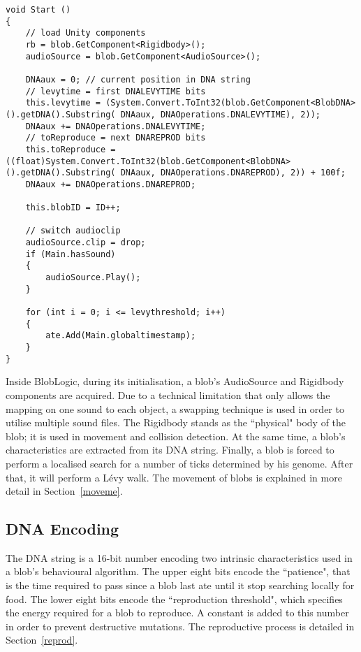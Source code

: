 \begin{lstlisting}
void Start ()
{
    // load Unity components
    rb = blob.GetComponent<Rigidbody>();
    audioSource = blob.GetComponent<AudioSource>();

    DNAaux = 0; // current position in DNA string
    // levytime = first DNALEVYTIME bits
    this.levytime = (System.Convert.ToInt32(blob.GetComponent<BlobDNA>().getDNA().Substring( DNAaux, DNAOperations.DNALEVYTIME), 2));
    DNAaux += DNAOperations.DNALEVYTIME;
    // toReproduce = next DNAREPROD bits
    this.toReproduce = ((float)System.Convert.ToInt32(blob.GetComponent<BlobDNA>().getDNA().Substring( DNAaux, DNAOperations.DNAREPROD), 2)) + 100f;
    DNAaux += DNAOperations.DNAREPROD;

    this.blobID = ID++;

    // switch audioclip
    audioSource.clip = drop;
    if (Main.hasSound)
    {
        audioSource.Play();
    }

    for (int i = 0; i <= levythreshold; i++)
    {
        ate.Add(Main.globaltimestamp);
    }
}
\end{lstlisting}
	
Inside BlobLogic, during its initialisation, a blob's AudioSource and Rigidbody components are acquired. Due to a technical limitation that only allows the mapping on one sound to each object, a swapping technique is used in order to utilise multiple sound files. The Rigidbody stands as the ``physical" body of the blob; it is used in movement and collision detection. At the same time, a blob's characteristics are extracted from its DNA string. Finally, a blob is forced to perform a localised search for a number of ticks determined by his genome. After that, it will perform a L\'evy walk. The movement of blobs is explained in more detail in Section~\ref{moveme}.

\subsection{DNA Encoding}
The DNA string is a 16-bit number encoding two intrinsic characteristics used in a blob's behavioural algorithm. The upper eight bits encode the ``patience", that is the time required to pass since a blob last ate until it stop searching locally for food. The lower eight bits encode the ``reproduction threshold", which specifies the energy required for a blob to reproduce. A constant is added to this number in order to prevent destructive mutations. The reproductive process is detailed in Section~\ref{reprod}.
	
